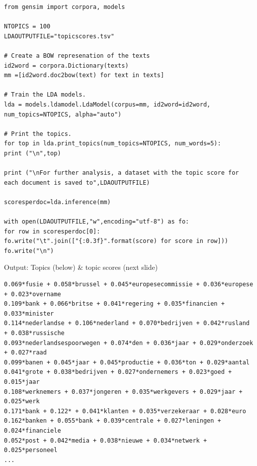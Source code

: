 \documentclass{beamer}
\begin{document}
\begin{frame}
\begin{lstlisting}
from gensim import corpora, models

NTOPICS = 100
LDAOUTPUTFILE="topicscores.tsv"

# Create a BOW represenation of the texts
id2word = corpora.Dictionary(texts)
mm =[id2word.doc2bow(text) for text in texts]

# Train the LDA models.
lda = models.ldamodel.LdaModel(corpus=mm, id2word=id2word, num_topics=NTOPICS, alpha="auto")

# Print the topics.
for top in lda.print_topics(num_topics=NTOPICS, num_words=5):
print ("\n",top)

print ("\nFor further analysis, a dataset with the topic score for each document is saved to",LDAOUTPUTFILE)

scoresperdoc=lda.inference(mm)

with open(LDAOUTPUTFILE,"w",encoding="utf-8") as fo:
for row in scoresperdoc[0]:
fo.write("\t".join(["{:0.3f}".format(score) for score in row]))
fo.write("\n")
\end{lstlisting}

\end{frame}


\begin{frame}[fragile]{Output: Topics (below) \& topic scores (next slide)}
\begin{lstlisting}
0.069*fusie + 0.058*brussel + 0.045*europesecommissie + 0.036*europese + 0.023*overname
0.109*bank + 0.066*britse + 0.041*regering + 0.035*financien + 0.033*minister
0.114*nederlandse + 0.106*nederland + 0.070*bedrijven + 0.042*rusland + 0.038*russische
0.093*nederlandsespoorwegen + 0.074*den + 0.036*jaar + 0.029*onderzoek + 0.027*raad
0.099*banen + 0.045*jaar + 0.045*productie + 0.036*ton + 0.029*aantal
0.041*grote + 0.038*bedrijven + 0.027*ondernemers + 0.023*goed + 0.015*jaar
0.108*werknemers + 0.037*jongeren + 0.035*werkgevers + 0.029*jaar + 0.025*werk
0.171*bank + 0.122* + 0.041*klanten + 0.035*verzekeraar + 0.028*euro
0.162*banken + 0.055*bank + 0.039*centrale + 0.027*leningen + 0.024*financiele
0.052*post + 0.042*media + 0.038*nieuwe + 0.034*netwerk + 0.025*personeel
...
\end{lstlisting}
\end{frame}
\end{document}
